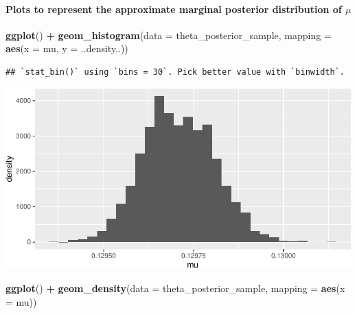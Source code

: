 \documentclass[]{article}
\newenvironment{Shaded}{\begin{snugshade}}{\end{snugshade}}
\newcommand{\KeywordTok}[1]{\textcolor[rgb]{0.13,0.29,0.53}{\textbf{#1}}}
\newcommand{\DataTypeTok}[1]{\textcolor[rgb]{0.13,0.29,0.53}{#1}}
\newcommand{\StringTok}[1]{\textcolor[rgb]{0.31,0.60,0.02}{#1}}
\newcommand{\OperatorTok}[1]{\textcolor[rgb]{0.81,0.36,0.00}{\textbf{#1}}}
\newcommand{\NormalTok}[1]{#1}
\let\oldparagraph\paragraph
\renewcommand{\paragraph}[1]{\oldparagraph{#1}\mbox{}}
\begin{document}
\newpage

\paragraph{\texorpdfstring{Plots to represent the approximate marginal
posterior distribution of
\(\mu\)}{Plots to represent the approximate marginal posterior distribution of \textbackslash{}mu}}\label{plots-to-represent-the-approximate-marginal-posterior-distribution-of-mu}

\begin{Shaded}
\begin{Highlighting}[]
\KeywordTok{ggplot}\NormalTok{() }\OperatorTok{+}
\StringTok{  }\KeywordTok{geom_histogram}\NormalTok{(}\DataTypeTok{data =}\NormalTok{ theta_posterior_sample, }\DataTypeTok{mapping =} \KeywordTok{aes}\NormalTok{(}\DataTypeTok{x =}\NormalTok{ mu, }\DataTypeTok{y =}\NormalTok{ ..density..))}
\end{Highlighting}
\end{Shaded}

\begin{verbatim}
## `stat_bin()` using `bins = 30`. Pick better value with `binwidth`.
\end{verbatim}

\includegraphics{20190225_bayes_MCMC_Metropolis_files/figure-latex/unnamed-chunk-8-1.pdf}

\begin{Shaded}
\begin{Highlighting}[]
\KeywordTok{ggplot}\NormalTok{() }\OperatorTok{+}
\StringTok{  }\KeywordTok{geom_density}\NormalTok{(}\DataTypeTok{data =}\NormalTok{ theta_posterior_sample, }\DataTypeTok{mapping =} \KeywordTok{aes}\NormalTok{(}\DataTypeTok{x =}\NormalTok{ mu))}
\end{Highlighting}
\end{Shaded}
\end{document}

